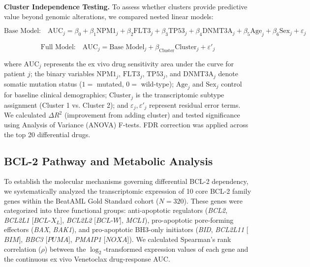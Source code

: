 \documentclass[11pt,a4paper]{article}
\begin{document}
\textbf{Cluster Independence Testing.} To assess whether clusters provide predictive value beyond genomic alterations, we compared nested linear models:

\begin{equation}
\text{Base Model:} \quad \text{AUC}_j = \beta_0 + \beta_1 \text{NPM1}_j + \beta_2 \text{FLT3}_j + \beta_3 \text{TP53}_j + \beta_4 \text{DNMT3A}_j + \beta_5 \text{Age}_j + \beta_6 \text{Sex}_j + \varepsilon_j
\end{equation}

\begin{equation}
\text{Full Model:} \quad \text{AUC}_j = \text{Base Model}_j + \beta_{\text{Cluster}} \text{Cluster}_j + \varepsilon'_j
\end{equation}

where $\text{AUC}_j$ represents the ex vivo drug sensitivity area under the curve for patient $j$; the binary variables $\text{NPM1}_j$, $\text{FLT3}_j$, $\text{TP53}_j$, and $\text{DNMT3A}_j$ denote somatic mutation status ($1 =$ mutated, $0 =$ wild-type); $\text{Age}_j$ and $\text{Sex}_j$ control for baseline clinical demographics; $\text{Cluster}_j$ is the transcriptomic subtype assignment (Cluster 1 vs. Cluster 2); and $\varepsilon_j, \varepsilon'_j$ represent residual error terms. We calculated $\Delta R^2$ (improvement from adding cluster) and tested significance using Analysis of Variance (ANOVA) F-tests. FDR correction was applied across the top 20 differential drugs.

\subsection{BCL-2 Pathway and Metabolic Analysis}

To establish the molecular mechanisms governing differential BCL-2 dependency, we systematically analyzed the transcriptomic expression of 10 core BCL-2 family genes within the BeatAML Gold Standard cohort ($N=320$). These genes were categorized into three functional groups: anti-apoptotic regulators (\textit{BCL2}, \textit{BCL2L1} [$BCL\text{-}X_L$], \textit{BCL2L2} [$BCL\text{-}W$], \textit{MCL1}), pro-apoptotic pore-forming effectors (\textit{BAX}, \textit{BAK1}), and pro-apoptotic BH3-only initiators (\textit{BID}, \textit{BCL2L11} [$BIM$], \textit{BBC3} [$PUMA$], \textit{PMAIP1} [$NOXA$]). We calculated Spearman's rank correlation ($\rho$) between the $\log_2$-transformed expression values of each gene and the continuous ex vivo Venetoclax drug-response AUC. 
\end{document}

